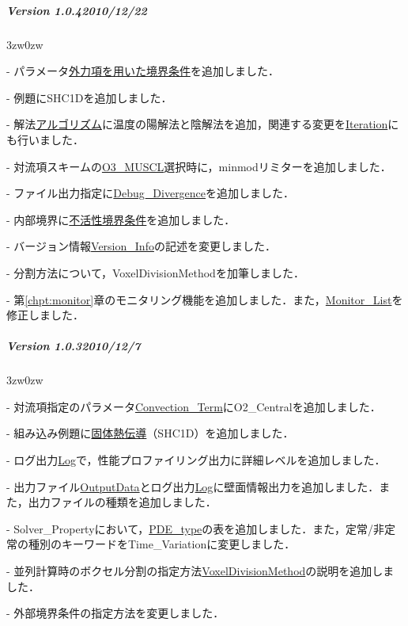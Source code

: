 {\vspace{3mm}

%
\subparagraph{Version 1.0.4\hspace{1cm}2010/12/22}

\begin{description}
\begin{indentation}{3zw}{0zw}
\item[-] パラメータ\hyperlink{tgt:external forcce}{外力項を用いた境界条件}を追加しました．
\item[-] 例題にSHC1Dを追加しました．
\item[-] 解法\hyperlink{tgt:algorithm}{アルゴリズム}に温度の陽解法と陰解法を追加，関連する変更を\hyperlink{tgt:iteration}{Iteration}にも行いました．
\item[-] 対流項スキームの\hyperlink{tgt:convection_term}{O3\_MUSCL}選択時に，minmodリミターを追加しました．
\item[-] ファイル出力指定に\hyperlink{tgt:fileio}{Debug\_Divergence}を追加しました．
\item[-] 内部境界に\hyperlink{tgt:inactive}{不活性境界条件}を追加しました．
\item[-] バージョン情報\hyperlink{tgt:version}{Version\_Info}の記述を変更しました．
\item[-] 分割方法について，\hypertarget{tgt:voxel_division}{VoxelDivisionMethod}を加筆しました．
\item[-] 第\ref{chpt:monitor}章のモニタリング機能を追加しました．また，\hyperlink{tgt:monitor_list}{Monitor\_List}を修正しました．
\end{indentation}
\end{description}

\vspace{3mm}

%
\subparagraph{Version 1.0.3\hspace{1cm}2010/12/7}

\begin{description}
\begin{indentation}{3zw}{0zw}
\item[-] 対流項指定のパラメータ\hyperlink{tgt:convection_term}{Convection\_Term}にO2\_Centralを追加しました．
\item[-] 組み込み例題に\hyperlink{tgt:example}{固体熱伝導}（SHC1D）を追加しました．
\item[-] ログ出力\hyperlink{tgt:log}{Log}で，性能プロファイリング出力に詳細レベルを追加しました．
\item[-] 出力ファイル\hyperlink{tgt:output_data}{OutputData}とログ出力\hyperlink{tgt:log}{Log}に壁面情報出力を追加しました．また，出力ファイルの種類を追加しました．
\item[-] Solver\_Propertyにおいて，\hyperlink{tgt:solver_property}{PDE\_type}の表を追加しました．また，定常/非定常の種別のキーワードをTime\_Variationに変更しました．
\item[-] 並列計算時のボクセル分割の指定方法\hyperlink{tgt:voxel_division}{VoxelDivisionMethod}の説明を追加しました．
\item[-] 外部境界条件の指定方法を変更しました．
\end{indentation}
\end{description}

}
